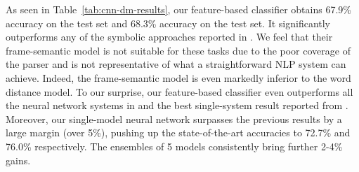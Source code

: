 As seen in Table~\ref{tab:cnn-dm-results}, our feature-based classifier obtains 67.9\% accuracy on the  test set and 68.3\% accuracy on the  test set. It significantly outperforms any of the symbolic approaches reported in . We feel that their frame-semantic model is not suitable for these tasks due to the poor coverage of the parser and is not representative of what a straightforward NLP system can achieve. Indeed, the frame-semantic model is even markedly inferior to the word distance model. To our surprise, our feature-based classifier even outperforms all the neural network systems in  and the best single-system result reported from .   Moreover, our single-model neural network surpasses the previous results by a large margin (over 5\%), pushing up the state-of-the-art accuracies to 72.7\% and 76.0\% respectively. The ensembles of 5 models consistently bring further 2-4\% gains.

